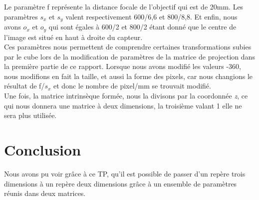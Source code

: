 \documentclass[a4paper,11pt]{article}
\begin{document}
  Le paramètre f représente la distance focale de l'objectif qui est de 20mm. Les paramètres $s_x$ et $s_y$
  valent respectivement 600/6,6 et 800/8,8. Et enfin, nous avons $o_x$ et $o_y$ qui sont égales à 
  600/2 et 800/2 étant donné que le centre de l'image est situé en haut à droite du capteur.\\
     
  Ces paramètres nous permettent de comprendre certaines transformations subies par le cube lors
  de la modification de paramètres de la matrice de projection dans la première partie de ce rapport.
  Lorsque nous avons modifié les valeurs -360, nous modifions en fait la taille, et aussi la forme
  des pixels, car nous changions le résultat de f/$s_x$ et donc le nombre de pixel/mm se trouvait modifié.\\
  
  Une fois, la matrice intrinsèque formée, nous la divisons par la coordonnée \textit{z},
  ce qui nous donnera une matrice à deux dimensions, la troisième valant 1 elle ne sera
  plus utilisée.
     
  
  
  \section*{Conclusion}
  Nous avons pu voir grâce à ce TP, qu'il est possible de passer d'un repère trois dimensions à un repère deux
  dimensions grâce à un ensemble de paramètres réunis dans deux matrices.
    
\end{document}
